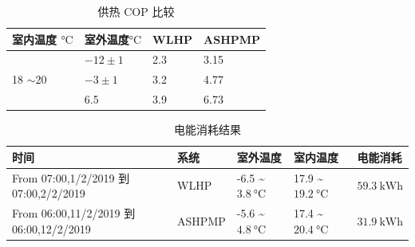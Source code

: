 \begin{table}[ht]
\centering
\caption{供热 COP 比较}
\begin{tabular}{@{}llll@{}}
\toprule
室内温度 $\unit{\degreeCelsius} $                        & 室外温度$\unit{\degreeCelsius} $                     & WLHP & ASHPMP \\ \midrule
\multirow{3}{*}{18 $\sim$20} & $-12 \pm 1$ & 2.3  & 3.15   \\
                             & $-3 \pm 1$  & 3.2  & 4.77   \\
                             & 6.5       & 3.9  & 6.73   \\ \bottomrule
\end{tabular}
\label{T:5}
\end{table}

\begin{table}[ht]
\centering
\caption{电能消耗结果}
\begin{tabular}{@{}lllll@{}}
\toprule
时间 & 系统 & 室外温度 & 室内温度 & 电能消耗 \\ \midrule
From 07:00,1/2/2019 到 07:00,2/2/2019&  WLHP & -6.5 \textasciitilde $\qty{3.8}{\degreeCelsius}$ & 17.9 \textasciitilde $\qty{19.2}{\degreeCelsius}$  & $\qty{59.3}{\kWh}$  \\
From 06:00,11/2/2019 到 06:00,12/2/2019& ASHPMP & -5.6 \textasciitilde $\qty{4.8}{\degreeCelsius}$ & 17.4 \textasciitilde $\qty{20.4}{\degreeCelsius}$  & $\qty{31.9}{\kWh} $ \\ \bottomrule
\end{tabular}
\label{T:6}
\end{table}

